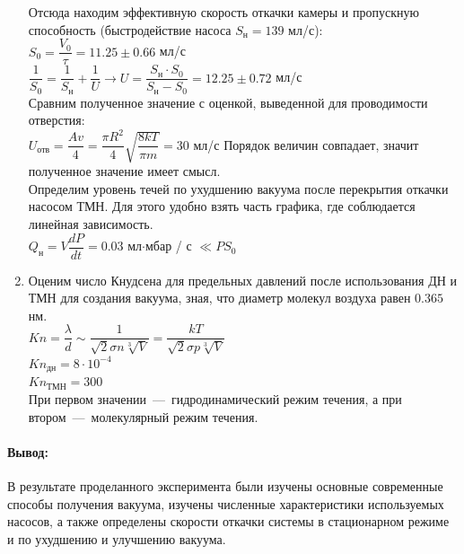 \documentclass[12pt,a4paper]{article}
\begin{document}
\begin{enumerate}
		Отсюда находим эффективную скорость откачки камеры и пропускную способность (быстродействие насоса $S_н = 139$ мл/с): \\
		$S_0 = \dfrac{V_0}{\tau} = 11.25 \pm 0.66$ мл/с\\
		
		$\dfrac{1}{S_0} = \dfrac{1}{S_н} + \dfrac{1}{U} \rightarrow U = \dfrac{S_н \cdot S_0}{S_н - S_0} = 12.25 \pm 0.72$ мл/с \\
		
		Сравним полученное значение с оценкой, выведенной для проводимости отверстия: \\
		$U_{отв} = \dfrac{Av}{4} = \dfrac{\pi R^2}{4} \sqrt{\dfrac{8kT}{\pi m}} = 30$ мл/с
		Порядок величин совпадает, значит полученное значение имеет смысл. \\
		
		Определим уровень течей по ухудшению вакуума после перекрытия откачки насосом ТМН. Для этого удобно взять часть графика, где соблюдается линейная зависимость.\\
		$Q_н = V \dfrac{dP}{dt} = 0.03$ мл$\cdot$мбар / с $\ll PS_0$
		
		\item Оценим число Кнудсена для предельных давлений после использования ДН и ТМН для создания вакуума, зная, что диаметр молекул воздуха равен $0.365$ нм.\\
		
		$Kn = \dfrac{\lambda}{d} \sim \dfrac{1}{\sqrt{2} \sigma n \sqrt[3]{V}} = \dfrac{kT}{\sqrt{2} \sigma p \sqrt[3]{V}}$ \\
		
		$Kn_{дн} = 8 \cdot 10^{-4}$ \\
		$Kn_{ТМН} = 300$\\
		
		При первом значении~---~гидродинамический режим течения, а при втором~---~молекулярный режим течения.
\end{enumerate}
	\paragraph* {Вывод:} В результате проделанного эксперимента были изучены основные современные способы получения вакуума, изучены численные характеристики используемых насосов, а также определены скорости откачки системы в стационарном режиме и по ухудшению и улучшению вакуума.		
\end{document}
